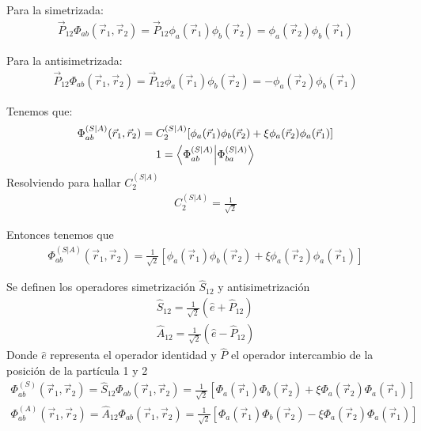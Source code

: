 \documentclass{article}
\begin{document}
Para la simetrizada:
\begin{gather}
  \vec P _{12 } \Phi _{ab } (\vec r_1, \vec r_2 ) = \vec P _{12 } \phi _a (\vec r_1) \phi_b(\vec r_2 ) = \phi_a (\vec r_2 ) \phi_b (\vec r_1 )
\end{gather}

Para la antisimetrizada: 
\begin{gather*}
  \vec P _{12 } \Phi _{ab } (\vec r_1, \vec r_2 ) = \vec P _{12 } \phi _a (\vec r_1) \phi_b(\vec r_2 ) = - \phi_a (\vec r_2 ) \phi_b (\vec r_1 )
\end{gather*}

\hfill 

\hfill 

Tenemos que: 
\begin{gather*}
  \Phi _{ab }  ^ {(S|A)} (\vec r_1, \vec r_2 ) = C_2 ^ {(S|A)} [\phi _{a }(\vec r_1)\phi _{b }(\vec r_2) + \xi \phi _{a }(\vec r_2)\phi _{a }(\vec r_1) ]  \\
  1 = \bra{\Phi _{ab }  ^ {(S|A)}}\ket{\Phi _{ba }  ^ {(S|A)}} 
\end{gather*}
Resolviendo para hallar $ C_2 ^ {(S|A )} $
\begin{gather*}
   C_2 ^ {(S|A )} = \frac{1}{\sqrt{2 } }
\end{gather*}

Entonces tenemos que 
\begin{gather*}
  \Phi _{ab }  ^ {(S|A)} (\vec r_1, \vec r_2 ) = \frac{1}{\sqrt{2} } [\phi _{a }(\vec r_1)\phi _{b }(\vec r_2) + \xi \phi _{a }(\vec r_2)\phi _{a }(\vec r_1) ] 
\end{gather*}

Se definen los operadores simetrización $ \hat S _{12 }  $ y antisimetrización  
\begin{gather*}
   \hat S _{12 } = \frac{1}{\sqrt{2 } } (\hat e + \hat P _{12 } )\\
  \hat A _{12 } = \frac{1}{\sqrt{2 } } (\hat e - \hat P _{12 } )
\end{gather*}
Donde $ \hat e  $ representa el operador identidad y $ \hat P  $ el operador intercambio de la posición de la partícula 1 y 2 
\begin{gather*}
   \Phi _{ab }  ^ {(S)} (\vec r_1, \vec r_2 ) = \hat S _{12 } \Phi _{ab }  (\vec r_1, \vec r_2 ) = \frac{1}{\sqrt{2} } [\Phi _{a }(\vec r_1)\Phi _{b }(\vec r_2) + \xi \Phi _{a }(\vec r_2)\Phi _{a }(\vec r_1) ] \\
   \Phi _{ab }  ^ {(A)} (\vec r_1, \vec r_2 ) = \hat A _{12 } \Phi _{ab }  (\vec r_1, \vec r_2 ) = \frac{1}{\sqrt{2} } [\Phi _{a }(\vec r_1)\Phi _{b }(\vec r_2) - \xi \Phi _{a }(\vec r_2)\Phi _{a }(\vec r_1) ] 
\end{gather*}
\end{document}
